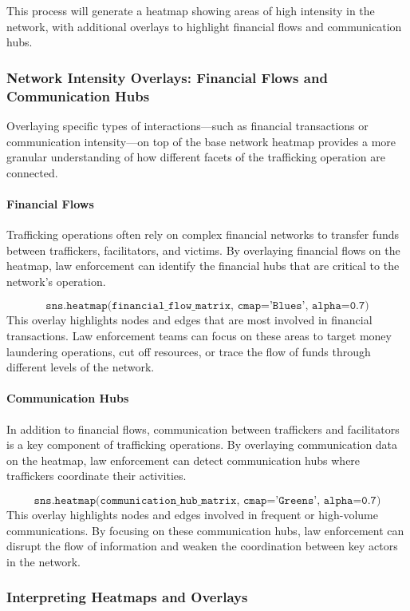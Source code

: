 \documentclass[%
 preprint, linenumbers,
 amsmath,amssymb,
 aps, physrev,
]{revtex4-2}
\begin{document}
This process will generate a heatmap showing areas of high intensity in the network, with additional overlays to highlight financial flows and communication hubs.

\subsubsection{Network Intensity Overlays: Financial Flows and Communication Hubs}

Overlaying specific types of interactions—such as financial transactions or communication intensity—on top of the base network heatmap provides a more granular understanding of how different facets of the trafficking operation are connected.

\paragraph{Financial Flows}
Trafficking operations often rely on complex financial networks to transfer funds between traffickers, facilitators, and victims. By overlaying financial flows on the heatmap, law enforcement can identify the financial hubs that are critical to the network's operation.

\[
\texttt{sns.heatmap(financial\_flow\_matrix, cmap='Blues', alpha=0.7)}
\]
This overlay highlights nodes and edges that are most involved in financial transactions. Law enforcement teams can focus on these areas to target money laundering operations, cut off resources, or trace the flow of funds through different levels of the network.

\paragraph{Communication Hubs}
In addition to financial flows, communication between traffickers and facilitators is a key component of trafficking operations. By overlaying communication data on the heatmap, law enforcement can detect communication hubs where traffickers coordinate their activities.

\[
\texttt{sns.heatmap(communication\_hub\_matrix, cmap='Greens', alpha=0.7)}
\]
This overlay highlights nodes and edges involved in frequent or high-volume communications. By focusing on these communication hubs, law enforcement can disrupt the flow of information and weaken the coordination between key actors in the network.

\subsubsection{Interpreting Heatmaps and Overlays}
\end{document}
